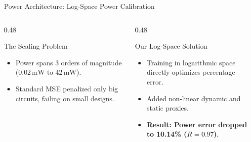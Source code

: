 \documentclass[aspectratio=169,10pt]{beamer}
\begin{document}
\begin{frame}{Power Architecture: Log-Space Power Calibration}
    \centering

    \vspace{0.35cm}
    \begin{columns}[T]
        \begin{column}{0.48\textwidth}
            \begin{block}{\centering The Scaling Problem}
                \footnotesize
                \begin{itemize}
                    \item Power spans 3 orders of magnitude ($0.02\,\text{mW}$ to $42\,\text{mW}$).
                    \item Standard MSE penalized only big circuits, failing on small designs.
                \end{itemize}
            \end{block}
        \end{column}
        \begin{column}{0.48\textwidth}
            \begin{block}{\centering Our Log-Space Solution}
                \footnotesize
                \begin{itemize}
                    \item Training in logarithmic space directly optimizes percentage error.
                    \item Added non-linear dynamic and static proxies.
                    \item \textbf{Result: Power error dropped to 10.14\% ($R = 0.97$)}.
                \end{itemize}
            \end{block}
        \end{column}
    \end{columns}
\end{frame}
\end{document}
